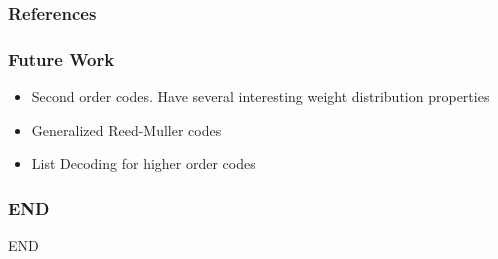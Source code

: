 \documentclass[xcolor=xvgnames]{beamer}
\newcommand{\rem}{Reed-Muller}
\begin{document}
\begin{frame}
  \frametitle{References}

\end{frame}

\begin{frame}
\frametitle{Future Work}
\begin{itemize}
 \item Second order codes. Have several interesting weight distribution properties
\item  Generalized \rem{} codes
\item List Decoding for higher order codes
\end{itemize}



\end{frame}

\begin{frame}
\frametitle{END}
END \\


\end{frame}

\end{document}
